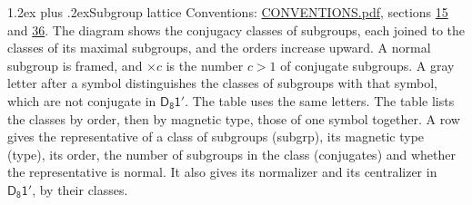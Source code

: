 \documentclass[10pt,a4paper]{article}
\makeatletter
\renewcommand\section{\@startsection{section}{1}{\z@}{-3ex plus -1ex minus -.2ex}%
  {1.2ex plus .2ex}{\normalfont\large\sffamily\bfseries\color{parttitle}}}
\numberwithin{equation}{section}
\newcommand{\grp}[1]{\mathsf{#1}}
\makeatother
\begin{document}
\section{Subgroup lattice}\label{s:subgroups}
Conventions: \href{../../CONVENTIONS.pdf}{CONVENTIONS.pdf}, sections \href{../../../rotation/CONVENTIONS.pdf\#conv.15}{15} and \href{../../CONVENTIONS.pdf\#conv.36}{36}.
The diagram shows the conjugacy classes of subgroups, each joined to the classes of its maximal subgroups, and the orders increase upward. \label{n:index.conjugates.c}\label{n:mark.conjugates}A normal subgroup is framed, and ${\times}c$ is the number $c > 1$ of conjugate subgroups. \label{n:mark.letter}A gray letter after a symbol distinguishes the classes of subgroups with that symbol, which are not conjugate in $\grp{D_{8}1'}$. The table uses the same letters. The table lists the classes by order, then by magnetic type, those of one symbol together. \label{n:head.subgroup}\label{n:head.magnetic.type}\label{n:head.order}\label{n:head.conjugates}\label{n:head.normal}A row gives the representative of a class of subgroups (subgrp), its magnetic type (type), its order, the number of subgroups in the class (conjugates) and whether the representative is normal. \label{n:head.normalizer}\label{n:head.centralizer}It also gives its normalizer and its centralizer in $\grp{D_{8}1'}$, by their classes. 
\end{document}

